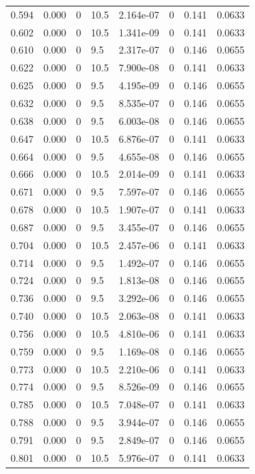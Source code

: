 \documentclass[preview]{standalone}
\begin{document}
{{{\begin{tabular}{L{1.2cm}C{1.2cm} C{0.3cm}C{0.5cm} C{1.4cm}C{1.4cm} C{1.4cm}C{1.4cm}}
  0.594  &  0.000  & 0     & 10.5 &  2.164e-07  & 0  & 0.141 &  0.0633   \\ 
  0.602  &  0.000  & 0     & 10.5 &  1.341e-09  & 0  & 0.141 &  0.0633   \\ 
  0.610  &  0.000  & 0     & 9.5 &  2.317e-07  & 0  & 0.146 &  0.0655   \\ 
  0.622  &  0.000  & 0     & 10.5 &  7.900e-08  & 0  & 0.141 &  0.0633   \\ 
  0.625  &  0.000  & 0     & 9.5 &  4.195e-09  & 0  & 0.146 &  0.0655   \\ 
  0.632  &  0.000  & 0     & 9.5 &  8.535e-07  & 0  & 0.146 &  0.0655   \\ 
  0.638  &  0.000  & 0     & 9.5 &  6.003e-08  & 0  & 0.146 &  0.0655   \\ 
  0.647  &  0.000  & 0     & 10.5 &  6.876e-07  & 0  & 0.141 &  0.0633   \\ 
  0.664  &  0.000  & 0     & 9.5 &  4.655e-08  & 0  & 0.146 &  0.0655   \\ 
  0.666  &  0.000  & 0     & 10.5 &  2.014e-09  & 0  & 0.141 &  0.0633   \\ 
  0.671  &  0.000  & 0     & 9.5 &  7.597e-07  & 0  & 0.146 &  0.0655   \\ 
  0.678  &  0.000  & 0     & 10.5 &  1.907e-07  & 0  & 0.141 &  0.0633   \\ 
  0.687  &  0.000  & 0     & 9.5 &  3.455e-07  & 0  & 0.146 &  0.0655   \\ 
  0.704  &  0.000  & 0     & 10.5 &  2.457e-06  & 0  & 0.141 &  0.0633   \\ 
  0.714  &  0.000  & 0     & 9.5 &  1.492e-07  & 0  & 0.146 &  0.0655   \\ 
  0.724  &  0.000  & 0     & 9.5 &  1.813e-08  & 0  & 0.146 &  0.0655   \\ 
  0.736  &  0.000  & 0     & 9.5 &  3.292e-06  & 0  & 0.146 &  0.0655   \\ 
  0.740  &  0.000  & 0     & 10.5 &  2.063e-08  & 0  & 0.141 &  0.0633   \\ 
  0.756  &  0.000  & 0     & 10.5 &  4.810e-06  & 0  & 0.141 &  0.0633   \\ 
  0.759  &  0.000  & 0     & 9.5 &  1.169e-08  & 0  & 0.146 &  0.0655   \\ 
  0.773  &  0.000  & 0     & 10.5 &  2.210e-06  & 0  & 0.141 &  0.0633   \\ 
  0.774  &  0.000  & 0     & 9.5 &  8.526e-09  & 0  & 0.146 &  0.0655   \\ 
  0.785  &  0.000  & 0     & 10.5 &  7.048e-07  & 0  & 0.141 &  0.0633   \\ 
  0.788  &  0.000  & 0     & 9.5 &  3.944e-07  & 0  & 0.146 &  0.0655   \\ 
  0.791  &  0.000  & 0     & 9.5 &  2.849e-07  & 0  & 0.146 &  0.0655   \\ 
  0.801  &  0.000  & 0     & 10.5 &  5.976e-07  & 0  & 0.141 &  0.0633   \\ 
\hline 
\end{tabular} 

}}}
\end{document}
